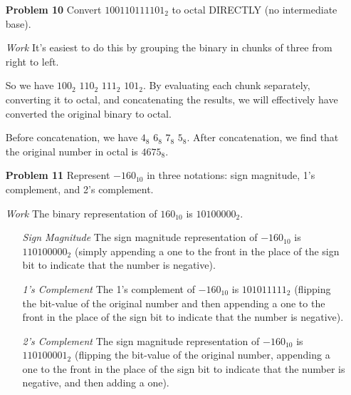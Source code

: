 \documentclass[12pt]{article}
\begin{document}
\begin{enumerate}
  \item[\textbf{Problem 10}] Convert $100110111101_2$ to octal DIRECTLY (no intermediate base).
\end{enumerate}

\begin{enumerate}
  \item[\textit{Work}] It's easiest to do this by grouping the binary in chunks of three from right to left.
  \item[] So we have $100_2$ $110_2$ $111_2$ $101_2$. By evaluating each chunk separately, converting it to octal, and concatenating the results, we will effectively have converted the original binary to octal.
  \item[] Before concatenation, we have $4_8$ $6_8$ $7_8$ $5_8$. After concatenation, we find that the original number in octal is $4675_8$.
\end{enumerate}


\begin{enumerate}
  \item[\textbf{Problem 11}] Represent $-160_{10}$ in three notations: sign magnitude, 1’s complement, and 2’s complement.
\end{enumerate}

\begin{enumerate}
  \item[\textit{Work}] The binary representation of $160_{10}$ is $10100000_2$.
  \begin{enumerate}
    \item[\textit{Sign Magnitude}] The sign magnitude representation of $-160_{10}$ is $110100000_2$ (simply appending a one to the front in the place of the sign bit to indicate that the number is negative).
    \item[\textit{1's Complement}] The 1's complement of $-160_{10}$ is $101011111_2$ (flipping the bit-value of the original number and then appending a one to the front in the place of the sign bit to indicate that the number is negative).
    \item[\textit{2's Complement}] The sign magnitude representation of $-160_{10}$ is $110100001_2$ (flipping the bit-value of the original number, appending a one to the front in the place of the sign bit to indicate that the number is negative, and then adding a one).
  \end{enumerate}
\end{enumerate}
\end{document}
